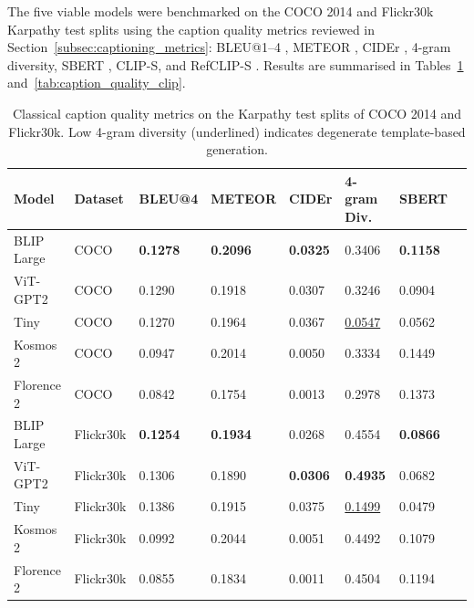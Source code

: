 The five viable models were benchmarked on the COCO 2014 \cite{Lin_2014_COCO} and Flickr30k \cite{Young_2014_Flickr30k} Karpathy test splits using the caption quality metrics reviewed in Section~\ref{subsec:captioning_metrics}: BLEU@1--4 \cite{Papineni_2002_BLEU}, METEOR \cite{Banerjee_2005_METEOR}, CIDEr \cite{Vedantam_2015_CIDEr}, 4-gram diversity, SBERT \cite{Reimers_2019_SBERT}, CLIP-S, and RefCLIP-S \cite{Hessel_2021_CLIPScore}. Results are summarised in Tables~\ref{tab:caption_quality_classical} and~\ref{tab:caption_quality_clip}.

\begin{table}[ht]
	\centering
	\footnotesize
	\begin{tabular}{llllllll}
		\hline
		\textbf{Model}  & \textbf{Dataset} & \textbf{BLEU@4}      &
		\textbf{METEOR} & \textbf{CIDEr}   & \textbf{4-gram Div.} &
		\textbf{SBERT}                                                                                                                       \\
		\hline
		BLIP Large      & COCO             & \textbf{0.1278}      & \textbf{0.2096} & \textbf{0.0325} & 0.3406             & \textbf{0.1158} \\
		ViT-GPT2        & COCO             & 0.1290               & 0.1918          & 0.0307          & 0.3246             & 0.0904          \\
		Tiny            & COCO             & 0.1270               & 0.1964          & 0.0367          & \underline{0.0547} & 0.0562          \\
		Kosmos 2        & COCO             & 0.0947               & 0.2014          & 0.0050          & 0.3334             & 0.1449          \\
		Florence 2      & COCO             & 0.0842               & 0.1754          & 0.0013          & 0.2978             & 0.1373          \\
		\hline
		BLIP Large      & Flickr30k        & \textbf{0.1254}      & \textbf{0.1934} & 0.0268          & 0.4554             & \textbf{0.0866} \\
		ViT-GPT2        & Flickr30k        & 0.1306               & 0.1890          & \textbf{0.0306} & \textbf{0.4935}    & 0.0682          \\
		Tiny            & Flickr30k        & 0.1386               & 0.1915          & 0.0375          & \underline{0.1499} & 0.0479          \\
		Kosmos 2        & Flickr30k        & 0.0992               & 0.2044          & 0.0051          & 0.4492             & 0.1079          \\
		Florence 2      & Flickr30k        & 0.0855               & 0.1834          & 0.0011          & 0.4504             & 0.1194          \\
		\hline
	\end{tabular}
	\caption{Classical caption quality metrics on the Karpathy test splits of COCO 2014
		and Flickr30k. Low 4-gram diversity (underlined) indicates degenerate
		template-based generation.}
	\label{tab:caption_quality_classical}
\end{table}


